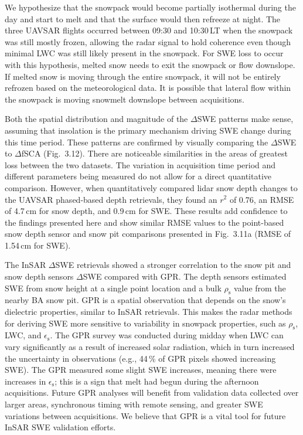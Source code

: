 We hypothesize that the snowpack would become partially isothermal during the day and start to melt and that the surface would then refreeze at night. The three UAVSAR flights occurred between 09:30 and 10:30\,LT when the snowpack was still mostly frozen, allowing the radar signal to hold coherence even though minimal LWC was still likely present in the snowpack. For SWE loss to occur with this hypothesis, melted snow needs to exit the snowpack or flow downslope. If melted snow is moving through the entire snowpack, it will not be entirely refrozen based on the meteorological data. It is possible that lateral flow within the snowpack \citep{webbTwodimensionalLiquidWater2021,eirikssonEvaluationHydrologicRelevance2013a, evansIsotopicEvidenceLateral2016} is moving snowmelt downslope between acquisitions.


Both the spatial distribution and magnitude of the $\Delta$SWE patterns make sense, assuming that insolation is the primary mechanism driving SWE change during this time period. These patterns are confirmed by visually comparing the $\Delta$SWE to $\Delta$fSCA (Fig.~3.12). There are noticeable similarities in the areas of greatest loss between the two datasets. The variation in acquisition time period and different parameters being measured do not allow for a direct quantitative comparison. However, when \citet{marshallLBandInSARDepth2021} quantitatively compared lidar snow depth changes to the UAVSAR phased-based depth retrievals, they found an $r^{2}$ of 0.76, an RMSE of 4.7\,cm for snow depth, and 0.9\,cm for SWE. These results add confidence to the findings presented here and show similar RMSE values to the point-based snow depth sensor and snow pit comparisons presented in Fig.~3.11a (RMSE of 1.54\,cm for SWE).


The InSAR $\Delta$SWE retrievals showed a stronger correlation to the snow pit and snow depth sensors $\Delta$SWE compared with GPR. The depth sensors estimated SWE from snow height at a single point location and a bulk $\rho_\mathrm{s}$ value from the nearby BA snow pit. GPR is a spatial observation that depends on the snow's dielectric properties, similar to InSAR retrievals. This makes the radar methods for deriving SWE more sensitive to variability in snowpack properties, such as $\rho_\mathrm{s}$, LWC, and $\epsilon_\mathrm{s}$. The GPR survey was conducted during midday when LWC can vary significantly as a result of increased solar radiation, which in turn increased the uncertainty in observations (e.g., 44\,\% of GPR pixels showed increasing SWE). The GPR measured some slight SWE increases, meaning there were increases in $\epsilon_\mathrm{s}$; this is a sign that melt had begun during the afternoon acquisitions. Future GPR analyses will benefit from validation data collected over larger areas, synchronous timing with remote sensing, and greater SWE variations between acquisitions. We believe that GPR is a vital tool for future InSAR SWE validation efforts.


